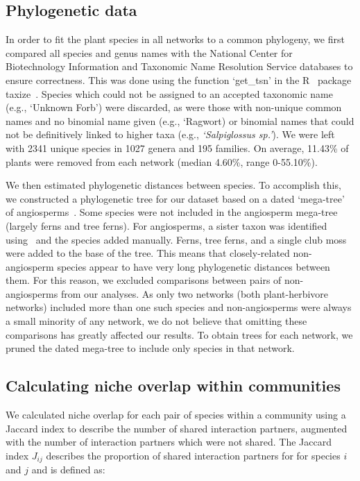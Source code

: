 \documentclass[12pt]{article}
\begin{document}
\begin{spacing}{1.5}
\subsection*{Phylogenetic data}

  In order to fit the plant species in all networks to a common phylogeny, 
  we first compared all species and genus names with the 
  National Center for Biotechnology Information
  and Taxonomic Name Resolution Service databases to ensure
  correctness. This was done using the function `get\_tsn' in the R~\citep{R}
  package taxize~\citep{taxize1,taxize2}. Species which could not 
  be assigned to an accepted taxonomic name (e.g., `Unknown Forb') were 
  discarded, as were those with non-unique common names and no binomial 
  name given (e.g., `Ragwort) or binomial names that could not be definitively 
  linked to  higher taxa (e.g., \emph{`Salpiglossus sp.'}). We were left with 
  2341 unique species in 1027 genera and 195 families. On average, 11.43\% of 
  plants were removed from each network (median 4.60\%, range 0-55.10\%).


  We then estimated phylogenetic distances between species. To accomplish 
  this, we constructed a phylogenetic tree for our dataset based on a dated
  `mega-tree' of angiosperms~\citep{Zanne2014}. Some species were not included
  in the angiosperm mega-tree (largely ferns and tree ferns). For angiosperms,
  a sister taxon was identified using~\citet{APW} and the species added manually.
  Ferns, tree ferns, and a single club moss were added to the base of the tree.
  This means that closely-related non-angiosperm species appear to have very long 
  phylogenetic distances between them. For this reason, we excluded comparisons 
  between pairs of non-angiosperms from our analyses. As only two networks (both 
  plant-herbivore networks) included more than one such species and non-angiosperms
  were always a small minority of any network, we do not 
  believe that omitting these comparisons has greatly affected our results.
  To obtain trees for each network, we 
  pruned the dated mega-tree to include only species in that network.


\subsection*{Calculating niche overlap within communities}

  We calculated niche overlap for each pair of species within a community 
  using a Jaccard index to describe the number of shared interaction 
  partners, augmented with the number of interaction partners which were 
  not shared. The Jaccard index $J_{ij}$ describes the proportion of 
  shared interaction partners for for species $i$ and $j$ and is defined as: 


\end{spacing}
\end{document}
